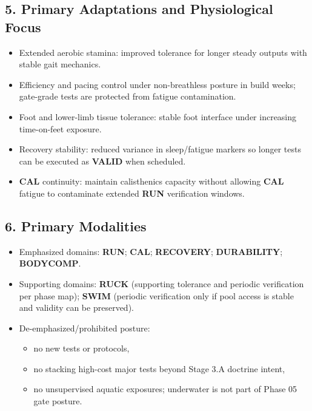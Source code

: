 \documentclass[10pt]{article}
\begin{document}
\subsection*{5. Primary Adaptations and Physiological Focus}

\begin{itemize}
\item Extended aerobic stamina: improved tolerance for longer steady outputs with stable gait mechanics.
\item Efficiency and pacing control under non-breathless posture in build weeks; gate-grade tests are protected from fatigue contamination.
\item Foot and lower-limb tissue tolerance: stable foot interface under increasing time-on-feet exposure.
\item Recovery stability: reduced variance in sleep/fatigue markers so longer tests can be executed as \textbf{VALID} when scheduled.
\item \textbf{CAL} continuity: maintain calisthenics capacity without allowing \textbf{CAL} fatigue to contaminate extended \textbf{RUN} verification windows.
\end{itemize}

\subsection*{6. Primary Modalities}

\begin{itemize}
\item Emphasized domains: \textbf{RUN}; \textbf{CAL}; \textbf{RECOVERY}; \textbf{DURABILITY}; \textbf{BODYCOMP}.
\item Supporting domains: \textbf{RUCK} (supporting tolerance and periodic verification per phase map); \textbf{SWIM} (periodic verification only if pool access is stable and validity can be preserved).
\item De-emphasized/prohibited posture:
\begin{itemize}
\item no new tests or protocols,
\item no stacking high-cost major tests beyond Stage 3.A doctrine intent,
\item no unsupervised aquatic exposures; underwater is not part of Phase 05 gate posture.
\end{itemize}
\end{itemize}
\end{document}
